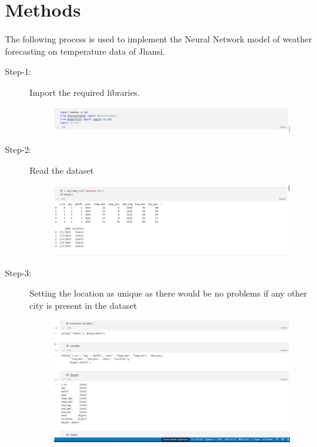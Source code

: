  \section{Methods}
 The following process is used to implement the Neural Network model of weather forecasting on temperature data of Jhansi.
 \begin{description} 


\item[Step-1:] Import the required libraries.


 \begin{figure}[hbt!]
  \centering
  \includegraphics[width=0.8\linewidth]{images/outputs/import.png}
\end{figure}



\item[Step-2:] Read the dataset


 \begin{figure}[hbt!]
  \centering
  \includegraphics[width=0.8\linewidth]{images/outputs/dataset reading.png}
\end{figure}


\item[Step-3:] Setting the location as unique as there would be no problems if any other city is present in the dataset

 \begin{figure}[hbt!]
  \centering
  \includegraphics[width=0.8\linewidth]{images/outputs/unique.png}
\end{figure}



\end{description}
